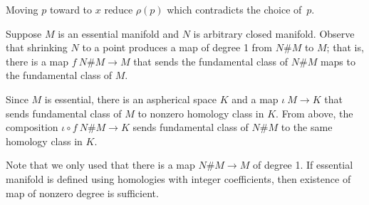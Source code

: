 Moving $p$ toward to $x$ reduce $\rho(p)$ which contradicts the choice of~$p$.

Suppose $M$ is an essential manifold and $N$ is arbitrary closed manifold.
Observe that shrinking $N$ to a point produces a map of degree 1 from $N\#M$ to $M$; that is, there is a map $f\:N\#M\to M$ that sends the fundamental class of $N\#M$ maps to the fundamental class of $M$.

Since $M$ is essential, there is an aspherical space $K$ and a map $\iota\:M\to K$ that sends fundamental class of $M$ to nonzero homology class in $K$.
From above, the composition $\iota\circ f\:N\#M\to K$ sends fundamental class of $N\#M$ to the same homology class in $K$.

 Note that we only used that there is a map $N\#M\to M$ of degree 1. If essential manifold is defined using homologies with integer coefficients, then existence of map of nonzero degree is sufficient.
